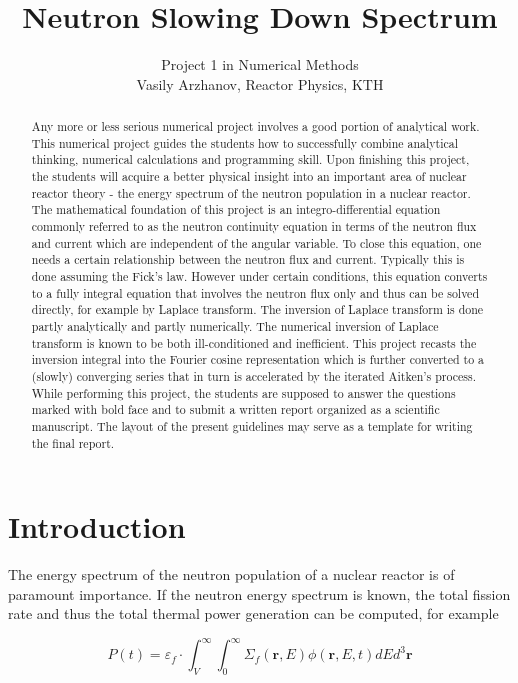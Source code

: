 \documentclass[10pt]{article}
\title{Neutron Slowing Down Spectrum }
\author{Project 1 in Numerical Methods\\
Vasily Arzhanov, Reactor Physics, $\mathrm{KTH}$}
\date{}
\begin{document}
\maketitle


\begin{abstract}
Any more or less serious numerical project involves a good portion of analytical work. This numerical project guides the students how to successfully combine analytical thinking, numerical calculations and programming skill. Upon finishing this project, the students will acquire a better physical insight into an important area of nuclear reactor theory - the energy spectrum of the neutron population in a nuclear reactor. The mathematical foundation of this project is an integro-differential equation commonly referred to as the neutron continuity equation in terms of the neutron flux and current which are independent of the angular variable. To close this equation, one needs a certain relationship between the neutron flux and current. Typically this is done assuming the Fick's law. However under certain conditions, this equation converts to a fully integral equation that involves the neutron flux only and thus can be solved directly, for example by Laplace transform. The inversion of Laplace transform is done partly analytically and partly numerically. The numerical inversion of Laplace transform is known to be both ill-conditioned and inefficient. This project recasts the inversion integral into the Fourier cosine representation which is further converted to a (slowly) converging series that in turn is accelerated by the iterated Aitken's process.
While performing this project, the students are supposed to answer the questions marked with bold face and to submit a written report organized as a scientific manuscript. The layout of the present guidelines may serve as a template for writing the final report.
\end{abstract}

\section{Introduction}
The energy spectrum of the neutron population of a nuclear reactor is of paramount importance. If the neutron energy spectrum is known, the total fission rate and thus the total thermal power generation can be computed, for example

$$
P(t)=\varepsilon_{f} \cdot \int_{V}^{\infty} \int_{0}^{\infty} \Sigma_{f}(\mathbf{r}, E) \phi(\mathbf{r}, E, t) d E d^{3} \mathbf{r}
$$
\end{document}
